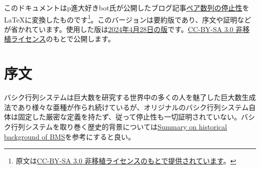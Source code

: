 \documentclass[dvipdfmx,uplatex]{jsarticle}
\title{\documenttitle}
\author{
	p進大好きbot 著
	\and
	Naruyoko 編集 %
}
\date{コンパイル日: \today}
\newif\iffull
\theoremstyle{customnonumberbreakfortheorem}
\theoremstyle{customnonumberbreakforproof}
\begin{document}
\maketitle

\renewcommand{\thefootnote}{$\diamondsuit$}

このドキュメントはp進大好きbot氏が公開したブログ記事\href{https://googology.fandom.com/ja/wiki/User\_blog:P\%E9\%80\%B2\%E5\%A4\%A7\%E5\%A5\%BD\%E3\%81\%8Dbot/\%E3\%83\%9A\%E3\%82\%A2\%E6\%95\%B0\%E5\%88\%97\%E3\%81\%AE\%E5\%81\%9C\%E6\%AD\%A2\%E6\%80\%A7}{ペア数列の停止性}を\LaTeX{}に変換したものです\footnote[0]{原文は\href{https://www.fandom.com/ja/licensing-ja}{CC-BY-SA 3.0 非移植ライセンスのもとで提供されています}。}。\iffull\else{このバージョンは要約版であり、序文や証明などが省かれています。}\fi 使用した版は\href{https://googology.fandom.com/ja/wiki/User\_blog:P\%E9\%80\%B2\%E5\%A4\%A7\%E5\%A5\%BD\%E3\%81\%8Dbot/\%E3\%83\%9A\%E3\%82\%A2\%E6\%95\%B0\%E5\%88\%97\%E3\%81\%AE\%E5\%81\%9C\%E6\%AD\%A2\%E6\%80\%A7?oldid=65412}{2024年4月28日の版}です。\href{https://creativecommons.org/licenses/by-sa/3.0/}{CC-BY-SA 3.0 非移植ライセンス}のもとで公開します。

\renewcommand{\thefootnote}{\arabic{footnote}}

\clearpage

\tableofcontents

\iffull

\section{概要}

ペア数列の停止性を示す。より正確には、数あるペア数列システムのうち１つの定式化を記述し、その中で標準形という概念を定義し、標準形のペア数列システムが停止することを証明する\footnote{当初の予定ではペア数列の解析、すなわちペア数列システムに伴う順序数表記系の限界を決定するつもりだったが、停止性の証明までを書き切るだけで大変疲れてしまった上に需要もさほどないと思うため、停止性までに留めた。}。

\fi

\section{序文}

\iffull

バシク行列システムは巨大数を研究する世界中の多くの人を魅了した巨大数生成法であり様々な亜種が作られ続けているが、オリジナルのバシク行列システム自体は固定した厳密な定義を持たず、従って停止性も一切証明されていない。バシク行列システムを取り巻く歴史的背景については\href{https://googology.wikia.com/wiki/User_blog:P\%E9\%80\%B2\%E5\%A4\%A7\%E5\%A5\%BD\%E3\%81\%8Dbot/Summary\_on\_historical\_background\_of\_BMS}{Summary on historical background of BMS}を参考にすると良い。
\end{document}
